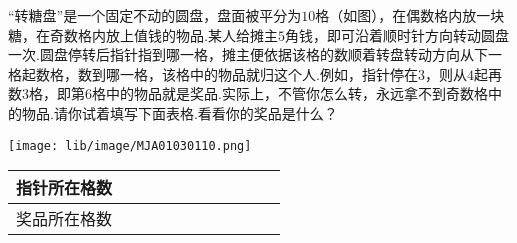 “转糖盘”是一个固定不动的圆盘，盘面被平分为$10$格（如图），在偶数格内放一块糖，在奇数格内放上值钱的物品.某人给摊主$5$角钱，即可沿着顺时针方向转动圆盘一次.圆盘停转后指针指到哪一格，摊主便依据该格的数顺着转盘转动方向从下一格起数格，数到哪一格，该格中的物品就归这个人.例如，指针停在$3$，则从$4$起再数$3$格，即第$6$格中的物品就是奖品.实际上，不管你怎么转，永远拿不到奇数格中的物品.请你试着填写下面表格.看看你的奖品是什么？\\
\begin{center}
	\texttt{[image: lib/image/MJA01030110.png]}
	\vspace{0.5cm}
\end{center}

\begin{tabular}{|l|l|l|l|l|l|l|l|l|l|l|}
	\hline
	指针所在格数 &     &     &     &     &     &     &     &     &     &  \\ \hline
	奖品所在格数 &     &     &     &     &     &     &     &     &     &  \\ \hline
\end{tabular}